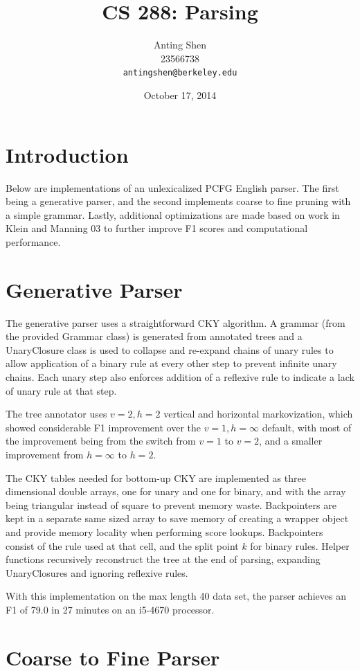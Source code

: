 \documentclass[11pt]{article}
\title{CS 288: Parsing}
\author{Anting Shen \\
  23566738 \\
  {\tt antingshen@berkeley.edu} \\
}
\date{October 17, 2014}
\begin{document}
\maketitle

\section{Introduction}
Below are implementations of an unlexicalized PCFG English parser. 
The first being a generative parser, and the second implements 
coarse to fine pruning with a simple grammar.
Lastly, additional optimizations are made based on work in Klein and Manning 03
to further improve F1 scores and computational performance.

\section{Generative Parser}

The generative parser uses a straightforward CKY algorithm. A grammar
(from the provided Grammar class) is generated from annotated
trees and a UnaryClosure class is used to collapse and re-expand chains of unary rules to allow
application of a binary rule at every other step to prevent infinite unary chains. Each unary
step also enforces addition of a reflexive rule to indicate a lack of unary rule at that step.

The tree annotator uses $v=2, h=2$ vertical and horizontal markovization, which showed considerable
F1 improvement over the $v=1, h=\infty$ default, with most of the improvement being from the
switch from $v=1$ to $v=2$, and a smaller improvement from $h=\infty$ to $h=2$.

The CKY tables needed for bottom-up CKY are implemented as three dimensional double arrays, one for
unary and one for binary, and with the array being triangular instead of square to prevent memory
waste. Backpointers are kept in a separate same sized array to save memory of
creating a wrapper object and provide memory locality when performing score lookups. Backpointers
consist of the rule used at that cell, and the split point $k$ for binary rules. Helper functions
recursively reconstruct the tree at the end of parsing, expanding UnaryClosures and ignoring reflexive
rules.

With this implementation on the max length 40 data set, the parser achieves an F1 of 79.0
in 27 minutes on an i5-4670 processor.

\section{Coarse to Fine Parser}
\end{document}
